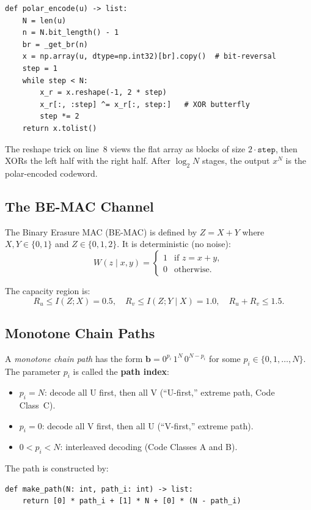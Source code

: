 \documentclass[11pt,a4paper]{article}
\begin{document}
\begin{lstlisting}[caption={Polar encoder (\texttt{encoder.py})},label=lst:encoder]
def polar_encode(u) -> list:
    N = len(u)
    n = N.bit_length() - 1
    br = _get_br(n)
    x = np.array(u, dtype=np.int32)[br].copy()  # bit-reversal
    step = 1
    while step < N:
        x_r = x.reshape(-1, 2 * step)
        x_r[:, :step] ^= x_r[:, step:]   # XOR butterfly
        step *= 2
    return x.tolist()
\end{lstlisting}

The reshape trick on line~8 views the flat array as blocks of size $2 \cdot \texttt{step}$, then XORs the left half with the right half. After $\log_2 N$ stages, the output $x^N$ is the polar-encoded codeword.

\subsection{The BE-MAC Channel}

The Binary Erasure MAC (BE-MAC) is defined by $Z = X + Y$ where $X, Y \in \{0, 1\}$ and $Z \in \{0, 1, 2\}$. It is deterministic (no noise):
\[
W(z \mid x, y) = \begin{cases} 1 & \text{if } z = x + y, \\ 0 & \text{otherwise.} \end{cases}
\]

The capacity region is:
\[
R_u \leq I(Z; X) = 0.5, \quad R_v \leq I(Z; Y \mid X) = 1.0, \quad R_u + R_v \leq 1.5.
\]

\subsection{Monotone Chain Paths}

A \emph{monotone chain path} has the form $\mathbf{b} = 0^{p_i}\, 1^N\, 0^{N - p_i}$ for some $p_i \in \{0, 1, \ldots, N\}$. The parameter $p_i$ is called the \textbf{path index}:
\begin{itemize}
    \item $p_i = N$: decode all U first, then all V (``U-first,'' extreme path, Code Class~C).
    \item $p_i = 0$: decode all V first, then all U (``V-first,'' extreme path).
    \item $0 < p_i < N$: interleaved decoding (Code Classes A and B).
\end{itemize}

The path is constructed by:
\begin{lstlisting}[caption={Path construction (\texttt{design.py})}]
def make_path(N: int, path_i: int) -> list:
    return [0] * path_i + [1] * N + [0] * (N - path_i)
\end{lstlisting}
\end{document}
